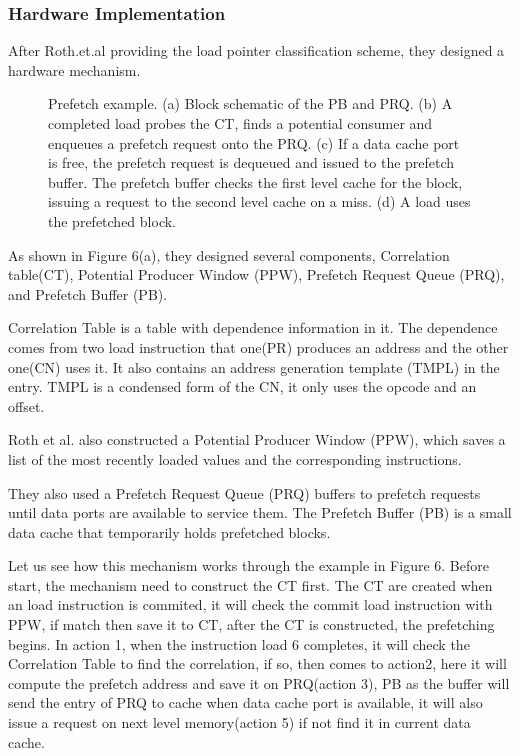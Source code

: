 \documentclass{acm_proc_article-sp}
\begin{document}
\subsubsection{Hardware Implementation}
After Roth.et.al providing the load pointer classification scheme, they
designed a hardware mechanism. 
\begin{figure}
\centering
{}
\caption{Prefetch example. (a) Block schematic of the PB and
PRQ. (b) A completed load probes the CT, finds a potential
consumer and enqueues a prefetch request onto the PRQ. (c) If
a data cache port is free, the prefetch request is dequeued and
issued to the prefetch buffer. The prefetch buffer checks the first
level cache for the block, issuing a request to the second level
cache on a miss. (d) A load uses the prefetched block.}
\end{figure}

As shown in Figure 6(a), they designed several components, Correlation   
table(CT), Potential Producer Window (PPW), Prefetch Request Queue
(PRQ), and Prefetch Buffer (PB).

Correlation Table is a table with dependence information in it. The
dependence comes from two load instruction that one(PR) produces an
address and the other one(CN) uses it. It also contains an address
generation template (TMPL) in the entry. TMPL is a condensed form of
the CN, it only uses the opcode and an offset.    

Roth et al. also constructed a Potential Producer Window (PPW), which
saves a list of the most recently loaded values and the
corresponding instructions. 

They also used a Prefetch Request Queue (PRQ) buffers to prefetch
requests until data ports are available to service them. The
Prefetch Buffer (PB) is a small data cache that temporarily holds
prefetched blocks. 

Let us see how this mechanism works through the example in Figure 6.
Before start, the mechanism need to construct the CT first. The CT are
created when an load instruction is commited, it will check the commit
load instruction with PPW, if match then save it to CT, after the CT
is constructed, the prefetching begins. In action 1, when the
instruction load 6 completes, it will check the Correlation Table to
find the correlation, if so, then comes to action2, here it will
compute the prefetch address and save it on PRQ(action 3), PB as the
buffer will send the entry of PRQ to cache when data cache port is
available, it will also issue a request on next level memory(action 5)
if not find it in current data cache.
\end{document}

